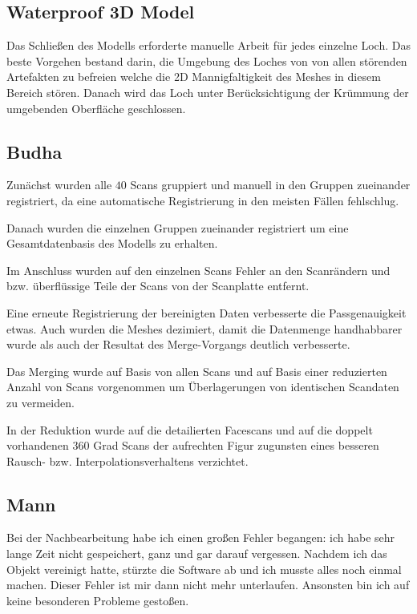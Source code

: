 \documentclass[]{article}
\begin{document}
\subsection{Waterproof 3D Model}

Das Schließen des Modells erforderte manuelle Arbeit für jedes einzelne Loch. Das beste Vorgehen bestand darin, die Umgebung des Loches von von allen störenden Artefakten zu befreien welche die 2D Mannigfaltigkeit des Meshes in diesem Bereich stören. Danach wird das Loch unter Berücksichtigung der Krümmung der umgebenden Oberfläche geschlossen.

\subsection{Budha}

Zunächst wurden alle $40$ Scans gruppiert und manuell in den Gruppen zueinander registriert, da eine automatische Registrierung in den meisten Fällen fehlschlug.

Danach wurden die einzelnen Gruppen zueinander registriert um eine Gesamtdatenbasis des Modells zu erhalten.

Im Anschluss wurden auf den einzelnen Scans Fehler an den Scanrändern und bzw. überflüssige Teile der Scans von der Scanplatte entfernt.

Eine erneute Registrierung der bereinigten Daten verbesserte die Passgenauigkeit etwas. 
Auch wurden die Meshes dezimiert, damit die Datenmenge handhabbarer wurde als auch der Resultat des Merge-Vorgangs deutlich verbesserte.

Das Merging wurde auf Basis von allen Scans und auf Basis einer reduzierten Anzahl von Scans vorgenommen um Überlagerungen von identischen Scandaten zu vermeiden.

In der Reduktion wurde auf die detailierten Facescans und auf die doppelt vorhandenen 360 Grad Scans der aufrechten Figur zugunsten eines besseren Rausch- bzw. Interpolationsverhaltens verzichtet.


\subsection{Mann}
Bei der Nachbearbeitung habe ich einen großen Fehler begangen: ich habe sehr lange Zeit nicht gespeichert, ganz und gar darauf vergessen. Nachdem ich das Objekt vereinigt hatte, stürzte die Software ab und ich musste alles noch einmal machen. Dieser Fehler ist mir dann nicht mehr unterlaufen. Ansonsten bin ich auf keine besonderen Probleme gestoßen.
\end{document}
